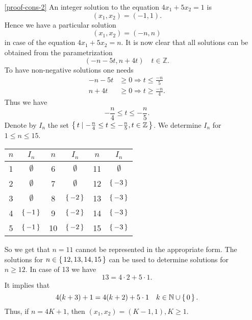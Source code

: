 \begin{enumerate}
\item[\ref{proof-cons-2}] An integer solution to the equation $4x_1+5x_2=1$ is
$$
(x_1,x_2)=(-1,1).
$$
Hence we have a particular solution 
$$
(x_1,x_2)=(-n,n)
$$
in case of the equation $4x_1+5x_2=n$. It is now clear that all solutions can be obtained from the parametrization
$$
(-n-5t,n+4t)\quad t\in\mathbb{Z}.
$$
To have non-negative solutions one needs
\begin{align*}
-n-5t&\geq 0\Rightarrow t\leq \frac{-n}{5}\\
n+4t&\geq 0\Rightarrow t\geq \frac{-n}{4}.
\end{align*}
Thus we have
$$
-\frac{n}{4}\leq t\leq -\frac{n}{5}.
$$
Denote by $I_n$ the set $\left\{\,t\mid -\frac{n}{4}\leq t\leq -\frac{n}{5}, t\in\mathbb{Z}\,\right\}$. 
We determine $I_n$ for $1\leq n\leq 15$.
\begin{center}
\begin{tabular}{|c|c||c|c||c|c|}
\hline
$n$ & $I_n$ & $n$ & $I_n$ & $n$ & $I_n$\\
\hline
1 & $\emptyset$ & 6 & $\emptyset$ &11 & $\emptyset$\\
\hline
2 & $\emptyset$ & 7 & $\emptyset$ &12 & $\left\{\, -3 \,\right\}$\\
\hline
3 & $\emptyset$ & 8 & $\left\{\, -2 \,\right\}$ &13 & $\left\{\, -3 \,\right\}$\\
\hline
4 & $\left\{\, -1 \,\right\}$ & 9 & $\left\{\, -2 \,\right\}$ &14 & $\left\{\, -3 \,\right\}$\\
\hline
5 & $\left\{\, -1 \,\right\}$ &10 & $\left\{\, -2 \,\right\}$ &15 & $\left\{\, -3 \,\right\}$\\
\hline
\end{tabular}
\end{center}
So we get that $n=11$ cannot be represented in the appropriate form. 
The solutions for $n\in\left\{\,12,13,14,15\,\right\}$ can be used to determine solutions for
$n\geq 12$. In case of 13 we have
$$
13=4\cdot 2+5\cdot 1.
$$
It implies that
$$
4(k+3)+1=4(k+2)+5\cdot 1\quad k\in\mathbb{N}\cup\left\{\,0\,\right\}.
$$
Thus, if $n=4K+1$, then $(x_1,x_2)=(K-1,1),K\geq 1$.


\end{enumerate}
